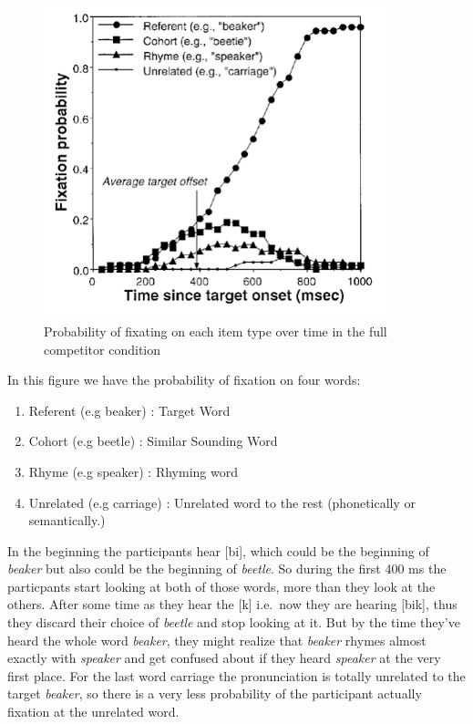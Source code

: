 \documentclass[
  a4paper,
]{article}
\providecommand{\tightlist}{%
  \setlength{\itemsep}{0pt}\setlength{\parskip}{0pt}}\usepackage{longtable,booktabs,array}
\begin{document}
\begin{figure}

{\centering \includegraphics[width=0.9\textwidth,height=\textheight]{img/ref_graph.png}

}

\caption{\label{fig-matrix}Probability of fixating on each item type
over time in the full competitor condition}

\end{figure}

In this figure we have the probability of fixation on four words:

\begin{enumerate}
\def\labelenumi{\arabic{enumi}.}
\tightlist
\item
  Referent (e.g beaker) : Target Word
\item
  Cohort (e.g beetle) : Similar Sounding Word
\item
  Rhyme (e.g speaker) : Rhyming word
\item
  Unrelated (e.g carriage) : Unrelated word to the rest (phonetically or
  semantically.)
\end{enumerate}

In the beginning the participants hear {[}bi{]}, which could be the
beginning of \emph{beaker} but also could be the beginning of
\emph{beetle}. So during the first 400 ms the particpants start looking
at both of those words, more than they look at the others. After some
time as they hear the {[}k{]} i.e.~now they are hearing {[}bik{]}, thus
they discard their choice of \emph{beetle} and stop looking at it. But
by the time they've heard the whole word \emph{beaker}, they might
realize that \emph{beaker} rhymes almost exactly with \emph{speaker} and
get confused about if they heard \emph{speaker} at the very first place.
For the last word carriage the pronunciation is totally unrelated to the
target \emph{beaker}, so there is a very less probability of the
participant actually fixation at the unrelated word.
\end{document}
